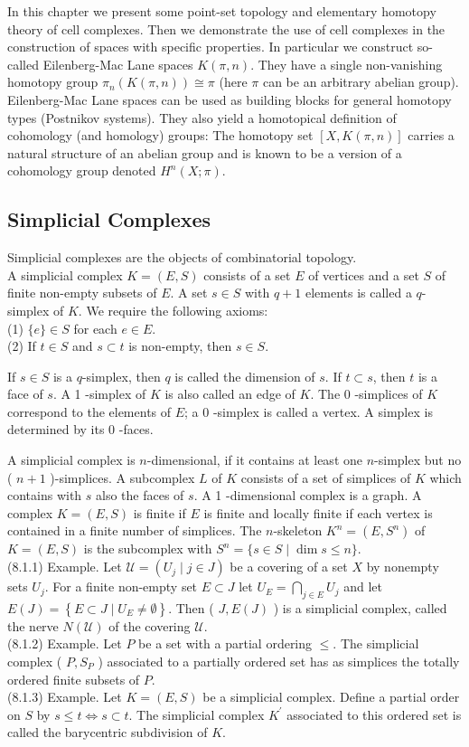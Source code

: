 \documentclass[10pt, letterpaper]{article}
\begin{document}
In this chapter we present some point-set topology and elementary homotopy theory of cell complexes. Then we demonstrate the use of cell complexes in the construction of spaces with specific properties. In particular we construct so-called Eilenberg-Mac Lane spaces $K(\pi, n)$. They have a single non-vanishing homotopy group $\pi_{n}(K(\pi, n)) \cong \pi$ (here $\pi$ can be an arbitrary abelian group). Eilenberg-Mac Lane spaces can be used as building blocks for general homotopy types (Postnikov systems). They also yield a homotopical definition of cohomology (and homology) groups: The homotopy set $[X, K(\pi, n)]$ carries a natural structure of an abelian group and is known to be a version of a cohomology group denoted $H^{n}(X ; \pi)$.

\subsection*{Simplicial Complexes}
Simplicial complexes are the objects of combinatorial topology.\\
A simplicial complex $K=(E, S)$ consists of a set $E$ of vertices and a set $S$ of finite non-empty subsets of $E$. A set $s \in S$ with $q+1$ elements is called a $q$-simplex of $K$. We require the following axioms:\\
(1) $\{e\} \in S$ for each $e \in E$.\\
(2) If $t \in S$ and $s \subset t$ is non-empty, then $s \in S$.

If $s \in S$ is a $q$-simplex, then $q$ is called the dimension of $s$. If $t \subset s$, then $t$ is a face of $s$. A 1 -simplex of $K$ is also called an edge of $K$. The 0 -simplices of $K$ correspond to the elements of $E$; a 0 -simplex is called a vertex. A simplex is determined by its 0 -faces.

A simplicial complex is $n$-dimensional, if it contains at least one $n$-simplex but no ( $n+1$ )-simplices. A subcomplex $L$ of $K$ consists of a set of simplices of $K$ which contains with $s$ also the faces of $s$. A 1 -dimensional complex is a graph. A complex $K=(E, S)$ is finite if $E$ is finite and locally finite if each vertex is contained in a finite number of simplices. The $n$-skeleton $K^{n}=\left(E, S^{n}\right)$ of $K=(E, S)$ is the subcomplex with $S^{n}=\{s \in S \mid \operatorname{dim} s \leq n\}$.\\
(8.1.1) Example. Let $\mathcal{U}=\left(U_{j} \mid j \in J\right)$ be a covering of a set $X$ by nonempty sets $U_{j}$. For a finite non-empty set $E \subset J$ let $U_{E}=\bigcap_{j \in E} U_{j}$ and let $E(J)=\left\{E \subset J \mid U_{E} \neq \emptyset\right\}$. Then ( $J, E(J)$ ) is a simplicial complex, called the nerve $N(\mathcal{U})$ of the covering $\mathcal{U}$.\\
(8.1.2) Example. Let $P$ be a set with a partial ordering $\leq$. The simplicial complex ( $P, S_{P}$ ) associated to a partially ordered set has as simplices the totally ordered finite subsets of $P$.\\
(8.1.3) Example. Let $K=(E, S)$ be a simplicial complex. Define a partial order on $S$ by $s \leq t \Leftrightarrow s \subset t$. The simplicial complex $K^{\prime}$ associated to this ordered set is called the barycentric subdivision of $K$.
\end{document}
